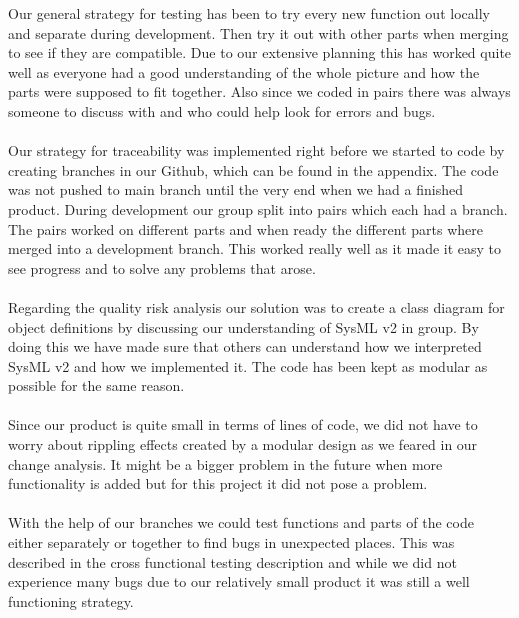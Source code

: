 \documentclass{article}
\begin{document}
Our general strategy for testing has been to try every new function out locally and separate during development. Then try it out with other parts when merging to see if they are compatible. Due to our extensive planning this has worked quite well as everyone had a good understanding of the whole picture and how the parts were supposed to fit together. Also since we coded in pairs there was always someone to discuss with and who could help look for errors and bugs.
\\\\
Our strategy for traceability was implemented right before we started to code by creating branches in our Github, which can be found in the appendix. The code was not pushed to main branch until the very end when we had a finished product. During development our group split into pairs which each had a branch. The pairs worked on different parts and when ready the different parts where merged into a development branch. This worked really well as it made it easy to see progress and to solve any problems that arose. 
\\\\
Regarding the quality risk analysis our solution was to create a class diagram for object definitions by discussing our understanding of SysML v2 in group. By doing this we have made sure that others can understand how we interpreted SysML v2 and how we implemented it. The code has been kept as modular as possible for the same reason. 
\\\\
Since our product is quite small in terms of lines of code, we did not have to worry about rippling effects created by a modular design as we feared in our change analysis. It might be a bigger problem in the future when more functionality is added but for this project it did not pose a problem. 
\\\\
With the help of our branches we could test functions and parts of the code either separately or together to find bugs in unexpected places. This was described in the cross functional testing description and while we did not experience many bugs due to our relatively small product it was still a well functioning strategy.

\newpage
\end{document}
